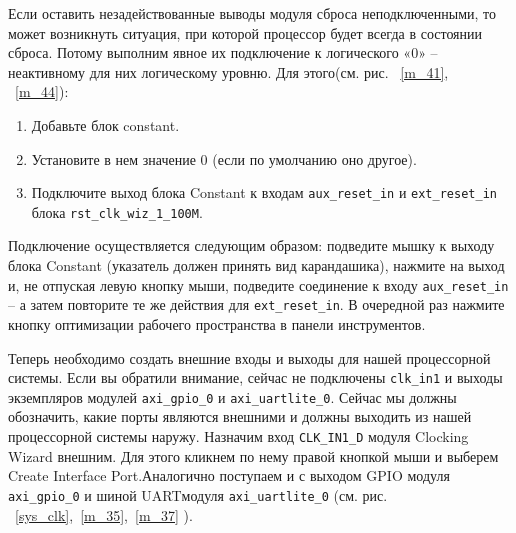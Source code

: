 \documentclass[a4paper,oneside ,10pt]{extreport}
\begin{document}
Если оставить незадействованные выводы модуля сброса неподключенными, 
то может возникнуть ситуация, при которой процессор будет всегда в состоянии 
сброса. Потому выполним явное их подключение к логического «0» – неактивному 
для них логическому уровню. Для этого(см. рис. ~\ref{m_41}, ~\ref{m_44}):

\begin{enumerate}
	\item Добавьте блок constant.
	\item Установите в нем значение 0 (если по умолчанию оно другое).
	\item Подключите выход блока Constant к входам \verb|aux_reset_in| и  \verb|ext_reset_in|
блока \verb|rst_clk_wiz_1_100M|.
\end{enumerate}

Подключение осуществляется следующим образом: подведите мышку к 
выходу блока Constant (указатель должен принять вид карандашика), нажмите на 
выход и, не отпуская левую кнопку мыши, подведите соединение к входу 
 \verb|aux_reset_in| – а затем повторите те же действия для \verb|ext_reset_in|. В очередной раз 
нажмите кнопку оптимизации рабочего пространства в панели инструментов. 

Теперь необходимо создать внешние входы и выходы для нашей 
процессорной системы. Если вы обратили внимание, сейчас не подключены  \verb|clk_in1| 
и выходы экземпляров модулей \verb|axi_gpio_0| и  \verb|axi_uartlite_0|. Сейчас мы должны 
обозначить, какие порты являются внешними и должны выходить из нашей 
процессорной системы наружу.
Назначим вход \verb|CLK_IN1_D| модуля Clocking Wizard внешним. Для этого кликнем 
по нему правой кнопкой мыши и выберем Create Interface Port.Аналогично поступаем и с выходом GPIO модуля \verb|axi_gpio_0| и шиной UARTмодуля  \verb|axi_uartlite_0| (см. рис. ~\ref{sys_clk},~\ref{m_35},~\ref{m_37} ). 
\end{document}
